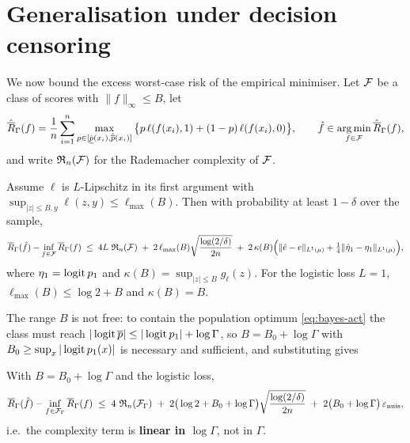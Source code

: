 \section{Generalisation under decision censoring}
\label{app:generalization-full}

We now bound the excess worst-case risk of the empirical minimiser. Let
$\mathcal{F}$ be a class of scores with $\|f\|_\infty\le B$, let
\[
  \hat{\overline{R}}_\Gamma(f) = \frac1n\sum_{i=1}^{n}
  \max_{p\in[\hat{\underline{p}}(x_i),\hat{\overline{p}}(x_i)]}
  \big\{ p\,\ell(f(x_i),1) + (1-p)\,\ell(f(x_i),0) \big\},
  \qquad
  \hat f \in \operatorname*{arg\,min}_{f\in\mathcal{F}}\hat{\overline{R}}_\Gamma(f),
\]
and write $\operatorname{\mathfrak{R}}_n(\mathcal{F})$ for the Rademacher complexity of $\mathcal{F}$.

\begin{theorem}
\label{thm:generalization}
Assume $\ell$ is $L$-Lipschitz in its first argument with
$\sup_{|z|\le B,y}\ell(z,y)\le \ell_{\max}(B)$. Then with probability at least
$1-\delta$ over the sample,
\begin{equation}
  \overline{R}_\Gamma(\hat f) - \inf_{f\in\mathcal{F}}\overline{R}_\Gamma(f)
  \;\le\;
  4L\,\operatorname{\mathfrak{R}}_n(\mathcal{F})
  \;+\;
  2\,\ell_{\max}(B)\sqrt{\frac{\log(2/\delta)}{2n}}
  \;+\;
  2\,\kappa(B)\Big(\|\hat e - e\|_{L^1(\mu)}
  + \tfrac14\|\hat\eta_1-\eta_1\|_{L^1(\mu)}\Big),
  \label{eq:gen-bound}
\end{equation}
where $\eta_1 = \operatorname{logit} p_1$ and $\kappa(B)=\sup_{|z|\le B} g_\ell(z)$.
For the logistic loss $L=1$, $\ell_{\max}(B)\le\log 2 + B$ and $\kappa(B)=B$.
\end{theorem}

The range $B$ is not free: to contain the population optimum
\eqref{eq:bayes-act} the class must reach $|\operatorname{logit}\overline{p}|\le|\operatorname{logit} p_1|+\log\Gamma$,
so $B=B_0+\log\Gamma$ with $B_0\ge\sup_x|\operatorname{logit} p_1(x)|$ is necessary and
sufficient, and substituting gives

\begin{corollary}
\label{cor:loggamma}
With $B=B_0+\log\Gamma$ and the logistic loss,
\begin{equation}
  \overline{R}_\Gamma(\hat f) - \inf_{f\in\mathcal{F}_\Gamma}\overline{R}_\Gamma(f)
  \;\le\;
  4\,\operatorname{\mathfrak{R}}_n(\mathcal{F}_\Gamma)
  \;+\;
  2\big(\log 2 + B_0 + \log\Gamma\big)\sqrt{\frac{\log(2/\delta)}{2n}}
  \;+\;
  2\big(B_0+\log\Gamma\big)\,\varepsilon_{\mathrm{nuis}},
  \label{eq:loggamma}
\end{equation}
i.e.\ the complexity term is \textbf{linear in $\log\Gamma$}, not in $\Gamma$.
\end{corollary}

